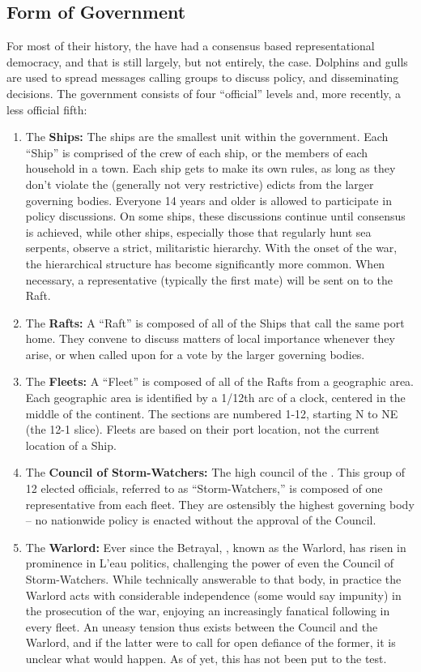 \documentclass[blue]{GL2020}
\begin{document}
\subsection{Form of Government} 
For most of their history, the \pShippies{} have had a consensus based representational democracy, and that is still largely, but not entirely, the case. Dolphins and gulls are used to spread messages calling groups to discuss policy, and disseminating decisions. The government consists of four “official” levels and, more recently, a less official fifth:
\begin{enumerate}	
	\item The \textbf{Ships:} The ships are the smallest unit within the \pShip{} government. Each ``Ship'' is comprised of the crew of each ship, or the members of each household in a town. Each ship gets to make its own rules, as long as they don't violate the (generally not very restrictive) edicts from the larger governing bodies. Everyone 14 years and older is allowed to participate in policy discussions. On some ships, these discussions continue until consensus is achieved, while other ships, especially those that regularly hunt sea serpents, observe a strict, militaristic hierarchy. With the onset of the war, the hierarchical structure has become significantly more common. When necessary, a representative (typically the first mate) will be sent on to the Raft.
	\item The \textbf{Rafts:} A ``Raft'' is composed of all of the Ships that call the same port home. They convene to discuss matters of local importance whenever they arise, or when called upon for a vote by the larger governing bodies.
	\item The \textbf{Fleets:} A ``Fleet'' is composed of all of the Rafts from a geographic area. Each geographic area is identified by a 1/12th arc of a clock, centered in the middle of the continent. The sections are numbered 1-12, starting N to NE (the 12-1 slice). Fleets are based on their port location, not the current location of a Ship.
	\item The \textbf{Council of Storm-Watchers:} The high council of the \pShip{}. This group of 12 elected officials, referred to as “Storm-Watchers,” is composed of one representative from each fleet. They are ostensibly the highest governing body – no nationwide policy is enacted without the approval of the Council.
	\item The \textbf{Warlord:} Ever since the Betrayal, \cLoud{\full}, known as the Warlord, has risen in prominence in L'eau politics, challenging the power of even the Council of Storm-Watchers. While technically answerable to that body, in practice the Warlord acts with considerable independence (some would say impunity) in the prosecution of the war, enjoying an increasingly fanatical following in every fleet. An uneasy tension thus exists between the Council and the Warlord, and if the latter were to call for open defiance of the former, it is unclear what would happen. As of yet, this has not been put to the test.
\end{enumerate}
\end{document}
